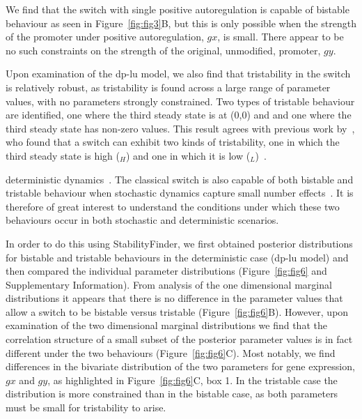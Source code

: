 {\noindent We find that the switch with single positive autoregulation is capable of bistable behaviour as seen in Figure~\ref{fig:fig3}B, but this is only possible when the strength of the promoter under positive autoregulation, $gx$, is small. There appear to be no such constraints on the strength of the original, unmodified, promoter, $gy$.  

Upon examination of the \acrshort{dp-lu} model, we also find that tristability in the switch is relatively robust, as tristability is found across a large range of parameter values, with no parameters strongly constrained. Two types of tristable behaviour are identified, one where the third steady state is at (0,0) and and one where the third steady state has non-zero values. This result agrees with previous work by~\textcite{Guantes:2008gs}, who found that a switch can exhibit two kinds of tristability, one in which the third steady state is high ($_H$) and one in which it is low ($_L$)~\autocite{Guantes:2008gs}. %

deterministic dynamics~\autocite{Guantes:2008gs}. The classical switch is also capable of both bistable and tristable behaviour when stochastic dynamics capture small number effects~\autocite{Ma:2012dt}. It is therefore of great interest to understand the conditions under which these two behaviours occur in both stochastic and deterministic scenarios. 

In order to do this using StabilityFinder, we first obtained posterior distributions for bistable and tristable behaviours in the deterministic case (\acrshort{dp-lu} model) and then compared the individual parameter distributions (Figure~\ref{fig:fig6} and Supplementary Information). From analysis of the one dimensional marginal distributions it appears that there is no difference in the parameter values that allow a switch to be bistable versus tristable (Figure~\ref{fig:fig6}B). However, upon examination of the two dimensional marginal distributions we find that the correlation structure of a small subset of the posterior parameter values is in fact different under the two behaviours (Figure~\ref{fig:fig6}C). Most notably, we find differences in the bivariate distribution of the two parameters for gene expression, $gx$ and $gy$, as highlighted in Figure~\ref{fig:fig6}C, box 1. In the tristable case the distribution is more constrained than in the bistable case, as both parameters must be small for tristability to arise. 


}
